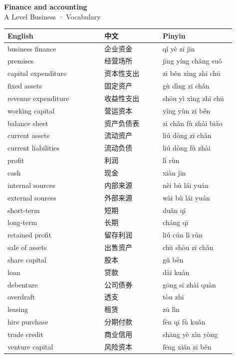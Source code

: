 \documentclass[11pt]{article}
\begin{document}
\begin{center}
  {\LARGE\bfseries Finance and accounting}\\[0.35em]
  {\large A Level Business · Vocabulary}
\end{center}
\vspace{0.6em}

\begin{longtable}{@{}p{0.40\linewidth}p{0.24\linewidth}p{0.30\linewidth}@{}}
\toprule
\textbf{English} & \textbf{中文} & \textbf{Pinyin} \\
\midrule
\endhead
\bottomrule
\endlastfoot
business finance & 企业资金 & qǐ yè zī jīn \\
premises & 经营场所 & jīng yíng chǎng suǒ \\
capital expenditure & 资本性支出 & zī běn xìng zhī chū \\
fixed assets & 固定资产 & gù dìng zī chǎn \\
revenue expenditure & 收益性支出 & shōu yì xìng zhī chū \\
working capital & 营运资本 & yíng yùn zī běn \\
balance sheet & 资产负债表 & zī chǎn fù zhài biǎo \\
current assets & 流动资产 & liú dòng zī chǎn \\
current liabilities & 流动负债 & liú dòng fù zhài \\
profit & 利润 & lì rùn \\
cash & 现金 & xiàn jīn \\
internal sources & 内部来源 & nèi bù lái yuán \\
external sources & 外部来源 & wài bù lái yuán \\
short-term & 短期 & duǎn qī \\
long-term & 长期 & cháng qī \\
retained profit & 留存利润 & liú cún lì rùn \\
sale of assets & 出售资产 & chū shòu zī chǎn \\
share capital & 股本 & gǔ běn \\
loan & 贷款 & dài kuǎn \\
debenture & 公司债券 & gōng sī zhài quàn \\
overdraft & 透支 & tòu zhī \\
leasing & 租赁 & zū lìn \\
hire purchase & 分期付款 & fēn qī fù kuǎn \\
trade credit & 商业信用 & shāng yè xìn yòng \\
venture capital & 风险资本 & fēng xiǎn zī běn \\

\end{longtable}
\end{document}

